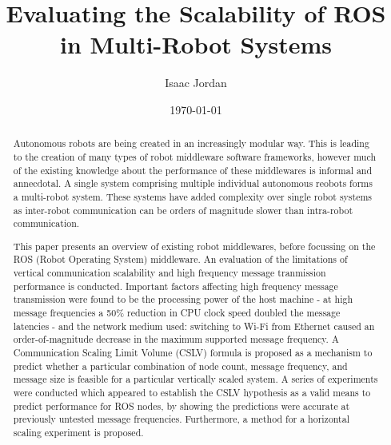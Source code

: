 \documentclass{l4proj}
\begin{document}
\title{Evaluating the Scalability of ROS in Multi-Robot Systems}
\author{Isaac Jordan}
\date{\today}
\maketitle

\begin{abstract}
Autonomous robots are being created in an increasingly modular way. This is leading to the creation of many types of robot middleware software frameworks, however much of the existing knowledge about the performance of these middlewares is informal and annecdotal. A single system comprising multiple individual autonomous reobots forms a multi-robot system. These systems have added complexity over single robot systems as inter-robot communication can be orders of magnitude slower than intra-robot communication.

This paper presents an overview of existing robot middlewares, before focussing on the ROS (Robot Operating System) middleware. An evaluation of the limitations of vertical communication scalability and high frequency message tranmission performance is conducted. Important factors affecting high frequency message transmission were found to be the processing power of the host machine - at high message frequencies a 50\% reduction in CPU clock speed doubled the message latencies - and the network medium used: switching to Wi-Fi from Ethernet caused an order-of-magnitude decrease in the maximum supported message frequency. A Communication Scaling Limit Volume (CSLV) formula is proposed as a mechanism to predict whether a particular combination of node count, message frequency, and message size is feasible for a particular vertically scaled system. A series of experiments were conducted which appeared to establish the CSLV hypothesis as a valid means to predict performance for ROS nodes, by showing the predictions were accurate at previously untested message frequencies. Furthermore, a method for a horizontal scaling experiment is proposed.
\end{abstract}

\educationalconsent
%
%
\tableofcontents

\pagebreak
{}


\end{document}
